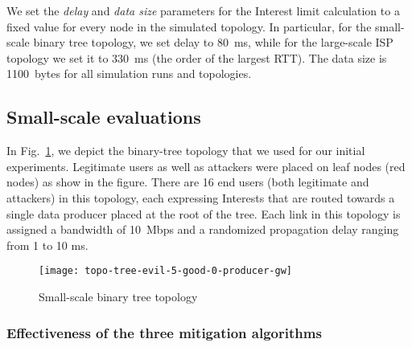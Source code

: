 We set the \emph{delay} and \emph{data size} parameters for the Interest limit calculation to a fixed value for every node in the simulated topology. In particular, for the small-scale binary tree topology, we set delay to 80~ms, while for the large-scale ISP topology we set it to 330~ms (the order of the largest RTT). The data size is 1100~bytes for all simulation runs and topologies.


\subsection{Small-scale evaluations}
\label{sec:small-scale}

In Fig.~\ref{fig:small-scale}, we depict the binary-tree topology that we used for our initial experiments.
Legitimate users as well as attackers were placed on leaf nodes (red nodes) as show in the figure. There are 16 end users (both legitimate and attackers) in this topology, each expressing Interests that are routed towards a single data producer placed at the root of the tree.  Each link in this topology is assigned a bandwidth of 10~Mbps and a randomized propagation delay ranging from 1 to 10 ms. 


\begin{figure}[]
  \centering
  \texttt{[image: topo-tree-evil-5-good-0-producer-gw]}
  \caption{Small-scale binary tree topology}
  \label{fig:small-scale}
\end{figure}


\subsubsection{Effectiveness of the three mitigation algorithms}

